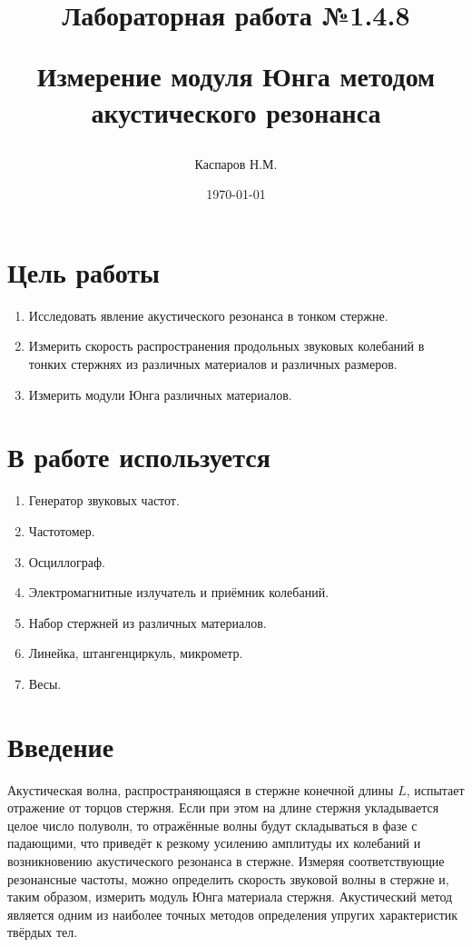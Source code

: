 \documentclass[a4paper, 12pt]{article}
\title{\begin{center}Лабораторная работа №1.4.8\end{center}
Измерение модуля Юнга методом акустического резонанса}
\author{Каспаров Н.М.}
\date{\today}
\begin{document}
    \maketitle
    \newpage
    
    \section{Цель работы}
    \begin{enumerate}
        \item Исследовать явление акустического резонанса в тонком стержне.
        \item Измерить скорость распространения продольных звуковых колебаний в тонких стержнях из различных материалов и различных размеров.
        \item Измерить модули Юнга различных материалов.
    \end{enumerate}
    
    \section{В работе используется}
    \begin{enumerate}
        \item Генератор звуковых частот.
        \item Частотомер.
        \item Осциллограф.
        \item Электромагнитные излучатель и приёмник колебаний.
        \item Набор стержней из различных материалов.
        \item Линейка, штангенциркуль, микрометр.
        \item Весы.
    \end{enumerate}

    \section{Введение}
        Акустическая волна, распространяющаяся в стержне конечной длины $L$,
        испытает отражение от торцов стержня. Если при этом на длине стержня
        укладывается целое число полуволн, то отражённые волны будут складываться в фазе с падающими, что приведёт к резкому усилению амплитуды
        их колебаний и возникновению акустического резонанса в стержне. Измеряя соответствующие резонансные частоты, можно определить скорость
        звуковой волны в стержне и, таким образом, измерить модуль Юнга материала стержня. Акустический метод является одним из наиболее точных
        методов определения упругих характеристик твёрдых тел.
\end{document}
